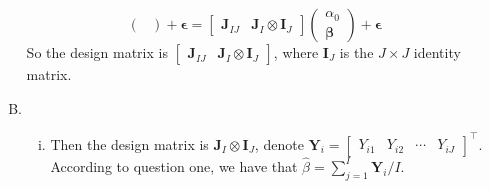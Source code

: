 \documentclass[12pt]{article}
\newcommand{\ttt}[1]{\textbf{#1}}
\begin{document}
\begin{enumerate}
\begin{enumerate}[A.]
$$\begin{pmatrix}
        \end{pmatrix} 
        + \bm{\epsilon}
        = \begin{bmatrix}
            \ttt{J}_{IJ} & \ttt{J}_I \otimes \ttt{I}_J
        \end{bmatrix}
        \begin{pmatrix}
            \alpha_0 \\
            \bm{\beta}
        \end{pmatrix} + \bm{\epsilon}
        $$
        So the design matrix is $\begin{bmatrix} \ttt{J}_{IJ} & \ttt{J}_I \otimes \ttt{I}_J \end{bmatrix}$, where $\ttt{I}_J$ is the $J \times J$ identity matrix.
        \item
        \begin{enumerate}[i.]
            \item
            Then the design matrix is $\ttt{J}_I \otimes \ttt{I}_J$, denote $\ttt{Y}_i = \begin{bmatrix} Y_{i1} & Y_{i2} & \cdots & Y_{iJ} \end{bmatrix}^\top$.
            According to question one, we have that $\hat{\beta} = \sum_{j=1}^{I} \ttt{Y}_i / I$.


\end{enumerate}
\end{enumerate}
\end{enumerate}
\end{document}
